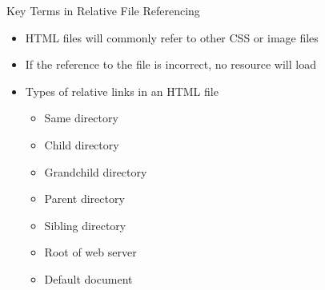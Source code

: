 \documentclass[14pt,aspectratio=169]{beamer}
\begin{document}
%
\begin{frame}{Key Terms in Relative File Referencing}
%
  \begin{itemize}
    \item HTML files will commonly refer to other CSS or image files
      \vspace*{-.1in}
    \item If the reference to the file is incorrect, no resource will load
      \vspace*{-.1in}
    \item Types of relative links in an HTML file
      \begin{itemize}
        \item Same directory
        \item Child directory
        \item Grandchild directory
        \item Parent directory
        \item Sibling directory
        \item Root of web server
        \item Default document
      \end{itemize}
  \end{itemize}
%
\end{frame}
\end{document}
